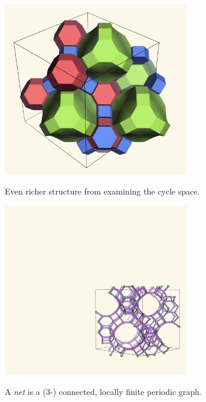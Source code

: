 \documentclass{beamer}
\begin{document}
\begin{frame}
  \begin{center}
    \includegraphics[height=3in]{fau-tiling-new}

    Even richer structure from examining the cycle space.
  \end{center}
\end{frame}

\begin{frame}
  \begin{center}
    \includegraphics[height=3in]{fau-111}

    A {\em net} is a (3-) connected, locally finite periodic graph.
  \end{center}
\end{frame}
\end{document}
